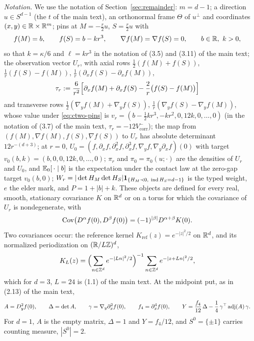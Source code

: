 \emph{Notation.} We use the notation of Section~\ref{sec:remainder}: $m=d-1$; a direction $u\in S^{d-1}$ (the $t$ of the main text), an orthonormal frame $\Theta$ of $u^\perp$ and coordinates $(x,y)\in\mathbb R\times\mathbb R^m$; pins at $M=-\frac r2u$, $S=\frac r2u$ with
\begin{equation}\label{eq:ctwo-pins}
f(M)=b,\qquad f(S)=b-kr^3,\qquad \nabla f(M)=\nabla f(S)=0,\qquad b\in\mathbb R,\ k>0,
\end{equation}
so that $k=\kappa/6$ and $\ell=kr^3$ in the notation of (3.5) and (3.11) of the main text; the observation vector $U_r$, with axial rows $\frac12(f(M)+f(S))$, $\frac1r(f(S)-f(M))$, $\frac1r(\partial_xf(S)-\partial_xf(M))$,
\begin{equation}\label{eq:ctwo-tau}
\tau_r:=\frac6{r^2}\Bigl[\partial_xf(M)+\partial_xf(S)-\frac2r\bigl(f(S)-f(M)\bigr)\Bigr]
\end{equation}
and transverse rows $\frac12(\nabla_yf(M)+\nabla_yf(S))$, $\frac1r(\nabla_yf(S)-\nabla_yf(M))$, whose value under \eqref{eq:ctwo-pins} is $v_r=(b-\frac12kr^3,-kr^2,0,12k,0,\dots,0)$ (in the notation of (3.7) of the main text, $\tau_r=-12V^-_{\mathrm{corr}}$); the map from $(f(M),\nabla f(M),f(S),\nabla f(S))$ to $U_r$ has absolute determinant $12r^{-(d+3)}$; at $r=0$, $U_0=(f,\partial_xf,\partial_x^2f,\partial_x^3f,\nabla_yf,\nabla_y\partial_xf)(0)$ with target $v_0(b,k)=(b,0,0,12k,0,\dots,0)$; $\pi_r$ and $\pi_0=\pi_0(u;\cdot)$ are the densities of $U_r$ and $U_0$, and $\mathbb E_0[\,\cdot\mid b]$ is the expectation under the contact law at the zero-gap target $v_0(b,0)$; $W_r=|\det H_M\det H_S|\ind_{\{H_M\prec0,\ \Ind H_S=d-1\}}$ is the typed weight, $e$ the elder mark, and $P=1+|b|+k$. These objects are defined for every real, smooth, stationary covariance $K$ on $\mathbb R^d$ or on a torus for which the covariance of $U_r$ is nondegenerate, with
\begin{equation}\label{eq:ctwo-jetcov}
\operatorname{Cov}\bigl(D^\alpha f(0),D^\beta f(0)\bigr)=(-1)^{|\beta|}D^{\alpha+\beta}K(0).
\end{equation}
Two covariances occur: the reference kernel $K_{\mathrm{ref}}(z)=e^{-|z|^2/2}$ on $\mathbb R^d$, and its normalized periodization on $(\mathbb R/L\mathbb Z)^d$,
\begin{equation}\label{eq:ctwo-KL}
K_L(z)=\Bigl(\sum_{n\in\mathbb Z^d}e^{-|Ln|^2/2}\Bigr)^{-1}\sum_{n\in\mathbb Z^d}e^{-|z+Ln|^2/2},
\end{equation}
which for $d=3$, $L=24$ is (1.1) of the main text. At the midpoint put, as in (2.13) of the main text,
\begin{equation}\label{eq:ctwo-Y}
A=D_y^2f(0),\qquad \Delta=\det A,\qquad \gamma=\nabla_y\partial_x^2f(0),\qquad f_4=\partial_x^4f(0),\qquad Y=\frac{f_4}{12}\,\Delta-\frac14\,\gamma^{\top}\operatorname{adj}(A)\,\gamma .
\end{equation}
For $d=1$, $A$ is the empty matrix, $\Delta=1$ and $Y=f_4/12$, and $S^0=\{\pm1\}$ carries counting measure, $|S^0|=2$.

